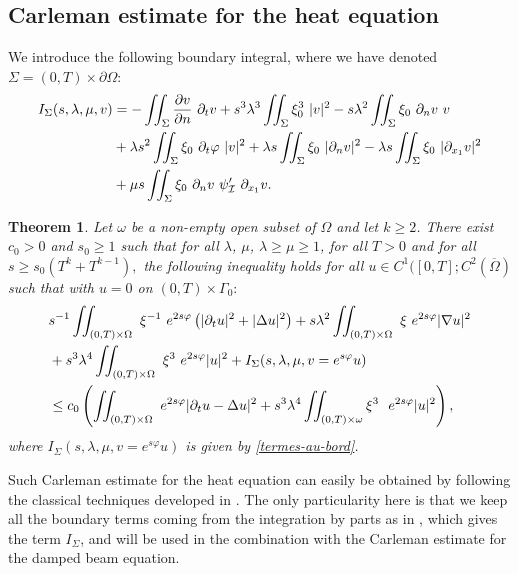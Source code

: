 \documentclass[a4paper, 12pt]{article}
\theoremstyle{plain}
\newtheorem{theorem}{Theorem}[section]
\theoremstyle{definition}
\numberwithin{theorem}{section}
\numberwithin{equation}{section}
\begin{document}
{\subsection{Carleman estimate for the heat equation}\label{preuve-carleman} %
 We introduce the following boundary integral, where we have denoted $\Sigma = (0,T) \times \partial \Omega$:
\begin{align}\label{termes-au-bord}\notag
I_{\Sigma}(s,\lambda,\mu,v)&=-\iint_\Sigma\frac{\partial v}{\partial n}~\partial_tv+s^3\lambda^3\iint_\Sigma\xi_0^3~|v|^2-s\lambda^2\iint_\Sigma\xi_0~\partial_n v~v\\ 
&+\lambda s^2\iint_\Sigma\xi_0~\partial_t\varphi~|v|^2+\lambda s\iint_\Sigma\xi_0~|\partial_n v|^2-\lambda s\iint_\Sigma\xi_0~|\partial_{x_1} v|^2\\ \notag
&+\mu s\iint_\Sigma\xi_0~\partial_n v~\psi'_{\mathcal{I}}~\partial_{x_1}v.
\end{align}
\begin{theorem}\label{chaleur}
    Let $\omega$ be a non-empty open subset of $\Omega$ and let $k\geq 2$. There exist $c_0>0$
    and $s_0\geq 1$ such that for all $\lambda$, $\mu$, $\lambda\geq \mu\geq 1$,
    for all $T>0$ and for all $s\geq s_0(T^k+T^{k-1}),$ the following inequality holds for all $u\in C^1([0,T];C^2(\overline{\Omega})$ such that with $u=0$ on $(0,T)\times\Gamma_0:$
\begin{align} 
& s^{-1}\iint_{(0,T)\times\Omega}~\xi^{-1}~e^{2s\varphi}\left(|\partial_tu|^2+|\Delta u|^2\right)+s\lambda^2\iint_{(0,T)\times\Omega}~\xi~e^{2s\varphi}|\nabla u|^2\notag\\ 
   &+s^3\lambda^4\iint_{(0,T)\times\Omega}~\xi^3~e^{2s\varphi}|u|^2+I_{\Sigma}(s,\lambda,\mu,v=e^{s\varphi}u)\label{CarlemanHeat}\\ &\leq c_0 
   \left(\iint_{(0,T)\times\Omega}~e^{2s\varphi}|\partial_tu-\Delta u|^2+s^3\lambda^4\iint_{(0,T)\times\omega} \xi^3~~e^{2s\varphi}| u|^2\right),\notag
\end{align}
where $I_{\Sigma}(s,\lambda,\mu,v=e^{s\varphi}u)$ is given by \eqref{termes-au-bord}.
\end{theorem}
Such Carleman estimate for the heat equation can easily be obtained by following the classical techniques developed in \cite{Cara,Fursikov}. The only particularity here is that we keep all the boundary terms coming from the integration by parts as in \cite{Badra}, which gives the term $I_\Sigma$, and will be used in the combination with the Carleman estimate for the damped beam equation.


}
\end{document}
